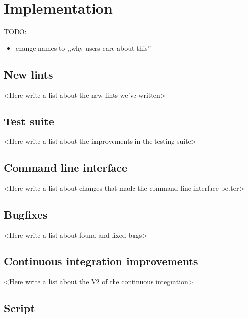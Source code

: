 \documentclass[licencjacka,en]{pracamgr}
\begin{document}

\chapter{Implementation}\label{r:chapter_implementation}

TODO:
\begin{itemize}
	\item change names to ,,why users care about this''
\end{itemize}

\section{New lints}\label{r:section_new_lints}

<Here write a list about the new lints we've written>

\section{Test suite}

<Here write a list about the improvements in the testing suite>

\section{Command line interface}

<Here write a list about changes that made the command line interface better>

\section{Bugfixes}

<Here write a list about found and fixed bugs>

\section{Continuous integration improvements}\label{r:section_continuous_integration_improvements}

<Here write a list about the V2 of the continuous integration>

\section{Script}
\end{document}
